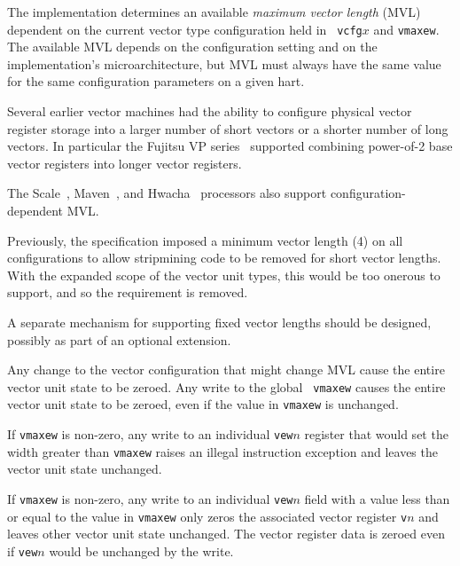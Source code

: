The implementation determines an available {\em maximum vector length}
(MVL) dependent on the current vector type configuration held in {\tt
  vcfg}$x$ and {\tt vmaxew}.  The available MVL depends on the
configuration setting and on the implementation's microarchitecture,
but MVL must always have the same value for the same configuration
parameters on a given hart.

\begin{commentary}
  Several earlier vector machines had the ability to configure
  physical vector register storage into a larger number of short
  vectors or a shorter number of long vectors. In particular the
  Fujitsu VP series~\cite{vp200} supported combining power-of-2 base
  vector registers into longer vector registers.

  The Scale~\cite{}, Maven~\cite{}, and Hwacha~\cite{} processors also
  support configuration-dependent MVL.
\end{commentary}

\begin{commentary}
  Previously, the specification imposed a minimum vector length (4) on
  all configurations to allow stripmining code to be removed for short
  vector lengths.  With the expanded scope of the vector unit types,
  this would be too onerous to support, and so the requirement is removed.
\end{commentary}

\begin{discussion}
  A separate mechanism for supporting fixed vector lengths should be
  designed, possibly as part of an optional extension.
\end{discussion}

Any change to the vector configuration that might change MVL cause the
entire vector unit state to be zeroed.  Any write to the global {\tt
  vmaxew} causes the entire vector unit state to be zeroed, even if
the value in {\tt vmaxew} is unchanged.

If {\tt vmaxew} is non-zero, any write to an individual {\tt vew}$n$
register that would set the width greater than {\tt vmaxew} raises an
illegal instruction exception and leaves the vector unit state
unchanged.

If {\tt vmaxew} is non-zero, any write to an individual {\tt vew}$n$
field with a value less than or equal to the value in {\tt vmaxew}
only zeros the associated vector register {\tt v}$n$ and leaves other
vector unit state unchanged.  The vector register data is zeroed even
if {\tt vew}$n$ would be unchanged by the write.

